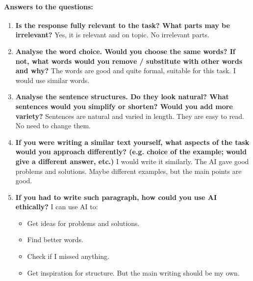 \documentclass[a4paper,12pt,english]{article}
\begin{document}
\paragraph*{Answers to the questions:}
\begin{enumerate}
    \item \textbf{Is the response fully relevant to the task? What parts may be irrelevant?} Yes, it is relevant and on topic. No irrelevant parts.

    \item \textbf{Analyse the word choice. Would you choose the same words? If not, what words would you remove / substitute with other words and why?} The words are good and quite formal, suitable for this task. I would use similar words.

    \item \textbf{Analyse the sentence structures. Do they look natural? What sentences would you simplify or shorten? Would you add more variety?} Sentences are natural and varied in length. They are easy to read. No need to change them.

    \item \textbf{If you were writing a similar text yourself, what aspects of the task would you approach differently? (e.g. choice of the example; would give a different answer, etc.)} I would write it similarly. The AI gave good problems and solutions. Maybe different examples, but the main points are good.

    \item \textbf{If you had to write such paragraph, how could you use AI ethically?} I can use AI to:
    \begin{itemize}
        \item Get ideas for problems and solutions.
        \item Find better words.
        \item Check if I missed anything.
        \item Get inspiration for structure.
        But the main writing should be my own.
    \end{itemize}
\end{enumerate}
\end{document}
